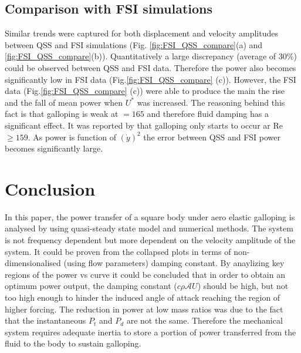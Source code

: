 \subsection{Comparison with FSI simulations}
 Similar trends were captured for both displacement and velocity amplitudes between QSS and FSI simulations (Fig. \ref{fig:FSI_QSS_compare}(a) and \ref{fig:FSI_QSS_compare}(b)). Quantitatively a large discrepancy (average of $30\%$) could be observed between QSS and FSI data. Therefore the power also becomes significantly low in FSI data (Fig.\ref{fig:FSI_QSS_compare} (c)). However, the FSI data (Fig.\ref{fig:FSI_QSS_compare} (c)) were able to produce the main the rise and the fall of mean power when $U^*$ was increased. The reasoning behind this fact is that galloping is weak at \reynoldsnumber$=165$  and therefore fluid damping has a significant effect. It was reported by \cite{Barrero-Gil2009} that galloping only starts to occur ar Re $\geq 159$. As power is function of $(\dot{y})^2$ the error between QSS and FSI power becomes significantly large.  
 

 

\section{Conclusion}

In this paper, the power transfer of a square body under aero elastic galloping is analysed by using quasi-steady state model and numerical methods. The system is not frequency dependent but more dependent on the velocity amplitude of the system. It could be proven from the collapsed plots in terms of non-dimensionalised (using flow parameters) damping constant. By anaylizing key regions of the power vs \ustar curve it could be concluded that in order to obtain an optimum power output, the damping constant ($c\rho\mathcal{A}U$) should be high, but not too high enough to hinder the induced angle of attack reaching the region of higher forcing. The reduction in power at low mass ratios was due to the fact that the instantaneous $P_t$ and $P_d$ are not the same. Therefore the mechanical system requires adequate inertia to store a portion of power transferred from the fluid to the body to sustain galloping. 






 

 
 
 

 
 



 
 
 
 
 
 
 
 
 
 
  
 
 
